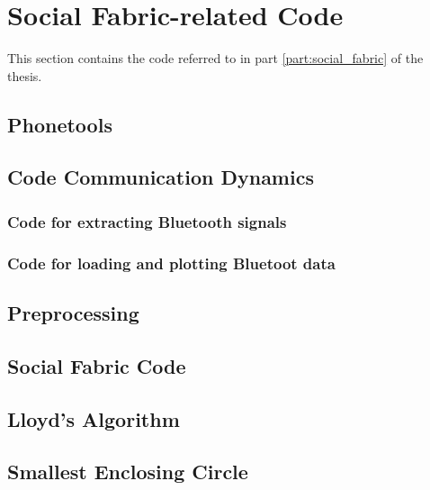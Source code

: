 



\section{Social Fabric-related Code}
This section contains the code referred to in part \ref{part:social_fabric} of the thesis.

\subsection{Phonetools}
\label{sec:phonetools.py}
\newpage

\subsection{Code Communication Dynamics}
\label{sec:communication_dymanic_code}
\subsubsection*{Code for extracting Bluetooth signals}
\subsubsection*{Code for loading and plotting Bluetoot data}
\newpage
{}
\newpage

\subsection{Preprocessing}
\label{sec:preprocess.py}

\subsection{Social Fabric Code}
\label{sec:psych_shared.py}

\subsection{Lloyd's Algorithm}
\label{sec:lloyds.py}

\subsection{Smallest Enclosing Circle}
\label{sec:smallestenclosingcircle.py}
\newpage

